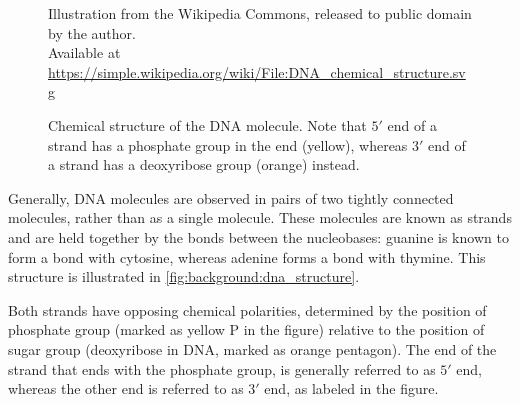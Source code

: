 \documentclass[parskip]{cs4rep}
\begin{document}
\begin{figure}[p]
    \centering
                 {Illustration from the Wikipedia Commons, released to public domain by the author.\\
                  Available at \url{https://simple.wikipedia.org/wiki/File:DNA_chemical_structure.svg}}
    \caption{Chemical structure of the DNA molecule. Note that $5'$ end of a strand has a phosphate group in the end (yellow), whereas $3'$ end of a strand has a deoxyribose group (orange) instead.}
    \label{fig:background:dna_structure}
\end{figure}

Generally, DNA molecules are observed in pairs of two tightly connected
molecules, rather than as a single molecule. These molecules are known as
strands and are held together by the bonds between the nucleobases: guanine is
known to form a bond with cytosine, whereas adenine forms a bond with thymine.
This structure is illustrated in \autoref{fig:background:dna_structure}.

Both strands have opposing chemical polarities, determined by the position
of phosphate group (marked as yellow P in the figure) relative to the position of sugar group (deoxyribose in DNA, marked as orange pentagon). The end of the strand that ends with the phosphate group, is generally referred to as $5'$ end, whereas the other end is referred to as $3'$ end, as labeled in the figure.
\end{document}
